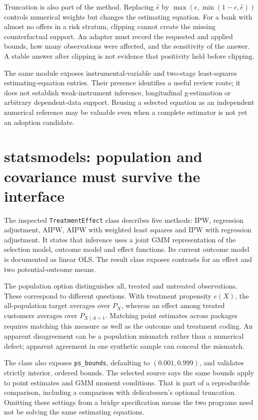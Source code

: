 Truncation is also part of the method. Replacing $\widehat e$ by
$\max(\epsilon,\min(1-\epsilon,\widehat e))$ controls numerical weights but
changes the estimating equation. For a bank with almost no offers in a risk
stratum, clipping cannot create the missing counterfactual support. An adapter
must record the requested and applied bounds, how many observations were
affected, and the sensitivity of the answer. A stable answer after clipping is
not evidence that positivity held before clipping.

The same module exposes instrumental-variable and two-stage least-squares
estimating-equation entries. Their presence identifies a useful review route;
it does not establish weak-instrument inference, longitudinal g-estimation or
arbitrary dependent-data support. Reusing a selected equation as an independent
numerical reference may be valuable even when a complete estimator is not yet
an adoption candidate. \citep{v13_sw_delicatessen}

\section{statsmodels: population and covariance must survive the interface}

The inspected \texttt{TreatmentEffect} class describes five methods: IPW,
regression adjustment, AIPW, AIPW with weighted least squares and IPW with
regression adjustment. It states that inference uses a joint GMM representation
of the selection model, outcome model and effect functions. Its current outcome
model is documented as linear OLS. The result class exposes contrasts for an
effect and two potential-outcome means. \citep{v13_sw_statsmodels}

The population option distinguishes all, treated and untreated observations.
These correspond to different questions. With treatment propensity $e(X)$,
the all-population target averages over $P_X$, whereas an effect among treated
customers averages over $P_{X\mid A=1}$. Matching point estimates across packages
requires matching this measure as well as the outcome and treatment coding.
An apparent disagreement can be a population mismatch rather than a numerical
defect; apparent agreement in one synthetic sample can conceal the mismatch.

The class also exposes \texttt{ps\_bounds}, defaulting to $(0.001,0.999)$, and
validates strictly interior, ordered bounds. The selected source says the same
bounds apply to point estimates and GMM moment conditions. That is part of a
reproducible comparison, including a comparison with delicatessen's optional
truncation. Omitting these settings from a bridge specification means the two
programs need not be solving the same estimating equations.

